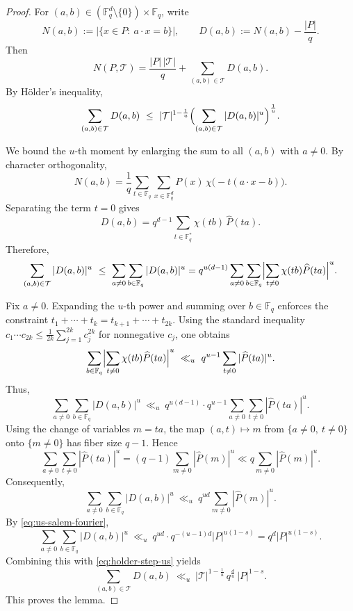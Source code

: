 \documentclass[10pt,a4paper]{amsart}
\begin{document}
\begin{proof}
For $(a,b)\in (\mathbb{F}_q^d\setminus\{0\})\times \mathbb{F}_q$, write
\[
N(a,b):=\bigl|\{x\in P:\ a\cdot x=b\}\bigr|,
\qquad
D(a,b):=N(a,b)-\frac{|P|}{q}.
\]
Then
\[
N(P,\mathcal{T})
=\frac{|P|\,|\mathcal{T}|}{q}
+
\sum_{(a,b)\in \mathcal{T}} D(a,b).
\]
By H\"older's inequality,
\begin{equation}\label{eq:holder-step-us}
\sum_{(a,b)\in \mathcal{T}} D(a,b)
\ \le\
|\mathcal{T}|^{1-\frac1u}\Bigl(\sum_{(a,b)\in \mathcal{T}} |D(a,b)|^{u}\Bigr)^{\frac{1}{u}}.
\end{equation}

We bound the $u$-th moment by enlarging the sum to all $(a,b)$ with $a\ne 0$.
By character orthogonality,
\[
N(a,b)
=
\frac{1}{q}\sum_{t\in\mathbb{F}_q}\sum_{x\in\mathbb{F}_q^d}
P(x)\,\chi\!\bigl(-t(a\cdot x-b)\bigr).
\]
Separating the term $t=0$ gives
\begin{equation}\label{eq:Dab-formula-us}
D(a,b)=q^{d-1}\sum_{t\in\mathbb{F}_q^\ast}\chi(tb)\,\widehat{P}(ta).
\end{equation}
Therefore,
\[
\sum_{(a,b)\in \mathcal{T}}|D(a,b)|^{u}
\ \le\
\sum_{a\ne 0}\sum_{b\in\mathbb{F}_q}|D(a,b)|^{u}
=
q^{u(d-1)}\sum_{a\ne 0}\sum_{b\in\mathbb{F}_q}
\Bigl|\sum_{t\ne 0}\chi(tb)\widehat{P}(ta)\Bigr|^{u}.
\]

Fix $a\ne 0$.
Expanding the $u$-th power and summing over $b\in\mathbb{F}_q$ enforces the constraint
$t_1+\cdots+t_k=t_{k+1}+\cdots+t_{2k}$.
Using the standard inequality
$c_1\cdots c_{2k}\le \frac{1}{2k}\sum\limits_{j=1}^{2k} c_j^{2k}$ for nonnegative $c_j$,
one obtains
\[
\sum_{b\in\mathbb{F}_q}\Bigl|\sum_{t\ne 0}\chi(tb)\widehat{P}(ta)\Bigr|^{u}
\ \ll_u\
q^{u-1}\sum_{t\ne 0} |\widehat{P}(ta)|^{u}.
\]
Thus,
\[
\sum_{a\ne 0}\sum_{b\in\mathbb{F}_q}|D(a,b)|^{u}
\ \ll_u\
q^{u(d-1)}\cdot q^{u-1}\sum_{a\ne 0}\sum_{t\ne 0} |\widehat{P}(ta)|^{u}.
\]
Using the change of variables $m=ta$, the map $(a,t)\mapsto m$ from $\{a\ne 0,\ t\ne 0\}$ onto
$\{m\ne 0\}$ has fiber size $q-1$. Hence
\[
\sum_{a\ne 0}\sum_{t\ne 0} |\widehat{P}(ta)|^{u}
=
(q-1)\sum_{m\ne 0}|\widehat{P}(m)|^{u}
\ll
q\sum_{m\ne 0}|\widehat{P}(m)|^{u}.
\]
Consequently,
\[
\sum_{a\ne 0}\sum_{b\in\mathbb{F}_q}|D(a,b)|^{u}
\ \ll_u\
q^{ud}\sum_{m\ne 0}|\widehat{P}(m)|^{u}.
\]
By \eqref{eq:us-salem-fourier},
\[
\sum_{a\ne 0}\sum_{b\in\mathbb{F}_q}|D(a,b)|^{u}
\ \ll_u\
q^{ud}\cdot q^{-(u-1)d}|P|^{u(1-s)}
=
q^{d}|P|^{u(1-s)}.
\]
Combining this with \eqref{eq:holder-step-us} yields
\[
\sum_{(a,b)\in \mathcal{T}} D(a,b)
\ \ll_u\
|\mathcal{T}|^{1-\frac1u}\,q^{\frac{d}{u}}\,|P|^{1-s}.
\]
This proves the lemma.
\end{proof}
\end{document}
